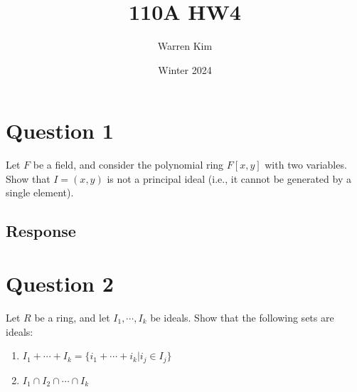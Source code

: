 \documentclass [12pt] {article}
\title{110A HW4}
\author{Warren Kim}
\date{Winter 2024}
\begin{document}
\maketitle

\section*{Question 1}
Let $F$ be a field, and consider the polynomial ring $F[x,y]$ with two variables. Show that $I=(x,y)$ is not a principal ideal (i.e., it cannot be generated by a single element). 
\subsection*{Response}
\newpage

\section*{Question 2}
Let $R$ be a ring, and let $I_1,\cdots,I_k$ be ideals. Show that the following sets are ideals: 
\begin{enumerate}
    \item $I_1+\cdots+I_k=\{i_1+\cdots+i_k|i_j\in I_j\}$
    \item $I_1\cap I_2\cap \cdots\cap I_k$
\end{enumerate}
\end{document}
